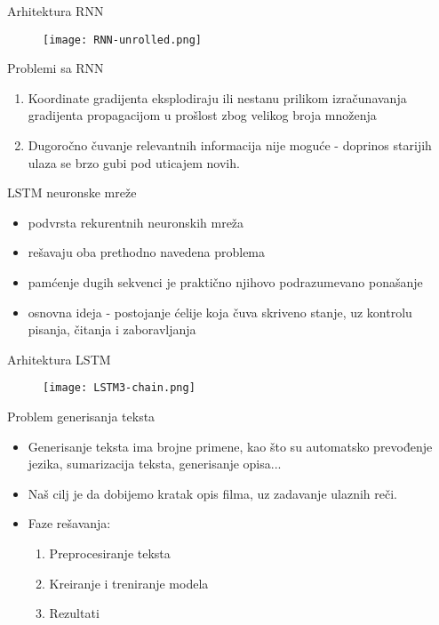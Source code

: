 \documentclass[table]{beamer}
\begin{document}
\begin{frame}{Arhitektura RNN}
\begin{figure}[htp]
    \centering
    \texttt{[image: RNN-unrolled.png]}
\end{figure}
    
\end{frame}

\begin{frame}{Problemi sa RNN}

\begin{enumerate}
    \item \alert{Koordinate gradijenta eksplodiraju ili nestanu} prilikom izračunavanja gradijenta propagacijom u prošlost zbog velikog broja množenja
    \item \alert{Dugoročno čuvanje relevantnih informacija nije moguće} - doprinos starijih ulaza se brzo gubi pod uticajem novih. 
\end{enumerate}

\end{frame}

\begin{frame}{LSTM neuronske mreže}

\begin{itemize}
    \item podvrsta rekurentnih neuronskih mreža
    \item rešavaju oba prethodno navedena problema
    \item pamćenje dugih sekvenci je praktično njihovo podrazumevano ponašanje
    \item osnovna ideja - postojanje ćelije koja čuva skriveno stanje, uz kontrolu pisanja, čitanja i zaboravljanja
\end{itemize}
    
\end{frame}

\begin{frame}{Arhitektura LSTM}
\begin{figure}
    \centering
    \texttt{[image: LSTM3-chain.png]}
\end{figure}
    
\end{frame}

\begin{frame}{Problem generisanja teksta}
\begin{itemize}
    \item Generisanje teksta ima brojne primene, kao što su automatsko prevođenje jezika, sumarizacija teksta, generisanje opisa...
    \item Naš cilj je da dobijemo kratak opis filma, uz zadavanje ulaznih reči.
    \item Faze rešavanja:
    \begin{enumerate}
        \item Preprocesiranje teksta
        \item Kreiranje i treniranje modela
        \item Rezultati
    \end{enumerate}
\end{itemize}
    
\end{frame}
\end{document}
